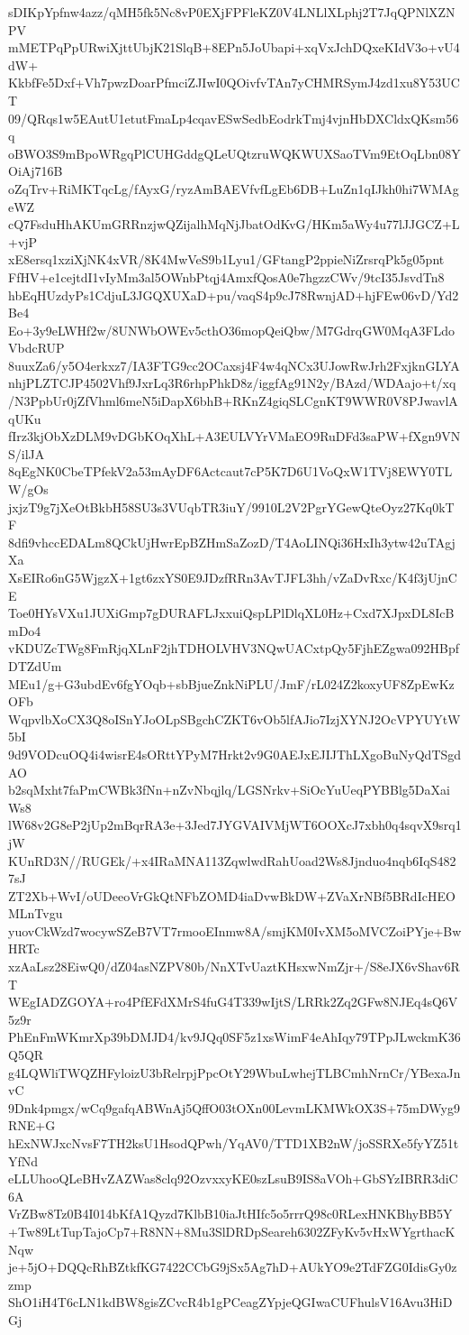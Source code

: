 sDIKpYpfnw4azz/qMH5fk5Nc8vP0EXjFPFleKZ0V4LNLlXLphj2T7JqQPNlXZNPV
mMETPqPpURwiXjttUbjK21SlqB+8EPn5JoUbapi+xqVxJchDQxeKIdV3o+vU4dW+
KkbfFe5Dxf+Vh7pwzDoarPfmciZJIwI0QOivfvTAn7yCHMRSymJ4zd1xu8Y53UCT
09/QRqs1w5EAutU1etutFmaLp4cqavESwSedbEodrkTmj4vjnHbDXCldxQKsm56q
oBWO3S9mBpoWRgqPlCUHGddgQLeUQtzruWQKWUXSaoTVm9EtOqLbn08YOiAj716B
oZqTrv+RiMKTqcLg/fAyxG/ryzAmBAEVfvfLgEb6DB+LuZn1qIJkh0hi7WMAgeWZ
cQ7FsduHhAKUmGRRnzjwQZijalhMqNjJbatOdKvG/HKm5aWy4u77lJJGCZ+L+vjP
xE8ersq1xziXjNK4xVR/8K4MwVeS9b1Lyu1/GFtangP2ppieNiZrsrqPk5g05pnt
FfHV+e1cejtdI1vIyMm3al5OWnbPtqj4AmxfQosA0e7hgzzCWv/9tcI35JsvdTn8
hbEqHUzdyPs1CdjuL3JGQXUXaD+pu/vaqS4p9cJ78RwnjAD+hjFEw06vD/Yd2Be4
Eo+3y9eLWHf2w/8UNWbOWEv5cthO36mopQeiQbw/M7GdrqGW0MqA3FLdoVbdcRUP
8uuxZa6/y5O4erkxz7/IA3FTG9cc2OCaxsj4F4w4qNCx3UJowRwJrh2FxjknGLYA
nhjPLZTCJP4502Vhf9JxrLq3R6rhpPhkD8z/iggfAg91N2y/BAzd/WDAajo+t/xq
/N3PpbUr0jZfVhml6meN5iDapX6bhB+RKnZ4giqSLCgnKT9WWR0V8PJwavlAqUKu
fIrz3kjObXzDLM9vDGbKOqXhL+A3EULVYrVMaEO9RuDFd3saPW+fXgn9VNS/ilJA
8qEgNK0CbeTPfekV2a53mAyDF6Actcaut7cP5K7D6U1VoQxW1TVj8EWY0TLW/gOs
jxjzT9g7jXeOtBkbH58SU3s3VUqbTR3iuY/9910L2V2PgrYGewQteOyz27Kq0kTF
8dfi9vhccEDALm8QCkUjHwrEpBZHmSaZozD/T4AoLINQi36HxIh3ytw42uTAgjXa
XsEIRo6nG5WjgzX+1gt6zxYS0E9JDzfRRn3AvTJFL3hh/vZaDvRxc/K4f3jUjnCE
Toe0HYsVXu1JUXiGmp7gDURAFLJxxuiQspLPlDlqXL0Hz+Cxd7XJpxDL8IcBmDo4
vKDUZcTWg8FmRjqXLnF2jhTDHOLVHV3NQwUACxtpQy5FjhEZgwa092HBpfDTZdUm
MEu1/g+G3ubdEv6fgYOqb+sbBjueZnkNiPLU/JmF/rL024Z2koxyUF8ZpEwKzOFb
WqpvlbXoCX3Q8oISnYJoOLpSBgchCZKT6vOb5lfAJio7IzjXYNJ2OcVPYUYtW5bI
9d9VODcuOQ4i4wisrE4sORttYPyM7Hrkt2v9G0AEJxEJIJThLXgoBuNyQdTSgdAO
b2sqMxht7faPmCWBk3fNn+nZvNbqjlq/LGSNrkv+SiOcYuUeqPYBBlg5DaXaiWs8
lW68v2G8eP2jUp2mBqrRA3e+3Jed7JYGVAIVMjWT6OOXcJ7xbh0q4sqvX9srq1jW
KUnRD3N//RUGEk/+x4IRaMNA113ZqwlwdRahUoad2Ws8Jjnduo4nqb6IqS4827sJ
ZT2Xb+WvI/oUDeeoVrGkQtNFbZOMD4iaDvwBkDW+ZVaXrNBf5BRdIcHEOMLnTvgu
yuovCkWzd7wocywSZeB7VT7rmooEInmw8A/smjKM0IvXM5oMVCZoiPYje+BwHRTc
xzAaLsz28EiwQ0/dZ04asNZPV80b/NnXTvUaztKHsxwNmZjr+/S8eJX6vShav6RT
WEgIADZGOYA+ro4PfEFdXMrS4fuG4T339wIjtS/LRRk2Zq2GFw8NJEq4sQ6V5z9r
PhEnFmWKmrXp39bDMJD4/kv9JQq0SF5z1xsWimF4eAhIqy79TPpJLwckmK36Q5QR
g4LQWliTWQZHFyloizU3bRelrpjPpcOtY29WbuLwhejTLBCmhNrnCr/YBexaJnvC
9Dnk4pmgx/wCq9gafqABWnAj5QffO03tOXn00LevmLKMWkOX3S+75mDWyg9RNE+G
hExNWJxcNvsF7TH2ksU1HsodQPwh/YqAV0/TTD1XB2nW/joSSRXe5fyYZ51tYfNd
eLLUhooQLeBHvZAZWas8clq92OzvxxyKE0szLsuB9IS8aVOh+GbSYzIBRR3diC6A
VrZBw8Tz0B4I014bKfA1Qyzd7KlbB10iaJtHIfc5o5rrrQ98c0RLexHNKBhyBB5Y
+Tw89LtTupTajoCp7+R8NN+8Mu3SlDRDpSeareh6302ZFyKv5vHxWYgrthacKNqw
je+5jO+DQQcRhBZtkfKG7422CCbG9jSx5Ag7hD+AUkYO9e2TdFZG0IdisGy0zzmp
ShO1iH4T6cLN1kdBW8gisZCvcR4b1gPCeagZYpjeQGIwaCUFhulsV16Avu3HiDGj
